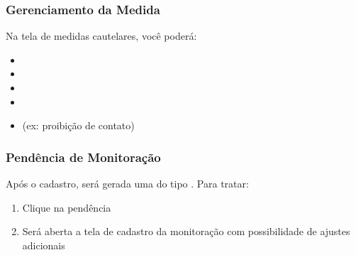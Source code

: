 \documentclass[letterpaper,10pt,brazil]{sphinxmanual}
\begin{document}
\subsubsection{Gerenciamento da Medida}
\label{\detokenize{projud_56_cadastromedidacautelar:gerenciamento-da-medida}}
\sphinxAtStartPar
Na tela de medidas cautelares, você poderá:
\begin{itemize}
\item {} 
\sphinxAtStartPar
{}

\item {} 
\sphinxAtStartPar
{}

\item {} 
\sphinxAtStartPar
{}

\item {} 
\sphinxAtStartPar
{}

\item {} 
\sphinxAtStartPar
{} (ex: proibição de contato)

\end{itemize}


\subsubsection{Pendência de Monitoração}
\label{\detokenize{projud_56_cadastromedidacautelar:pendencia-de-monitoracao}}
\sphinxAtStartPar
Após o cadastro, será gerada uma  do tipo . Para tratar:
\begin{enumerate}
%
\item {} 
\sphinxAtStartPar
Clique na pendência

\item {} 
\sphinxAtStartPar
Será aberta a tela de cadastro da monitoração com possibilidade de ajustes adicionais

\end{enumerate}
\end{document}
